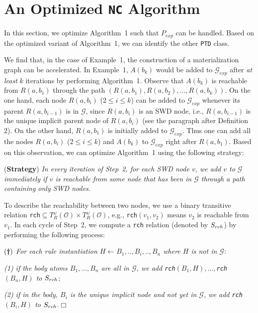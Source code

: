 \documentclass{article}
\begin{document}
\section{An Optimized \texttt{NC} Algorithm}

In this section, we optimize Algorithm~1 such that $P_{exp}$
can be handled. Based on the optimized variant of Algorithm~1, we can identify the other \texttt{PTD} class.

We find that, in the case of Example~1, the construction of a materialization graph can be accelerated.
In Example~1, $A(b_k)$ would be added to $\mathcal{G}_{exp}$ after \emph{at least} $k$ iterations by performing Algorithm~1. Observe that $A(b_k)$ is reachable from $R(a,b_1)$ through the path $(R(a,b_1),R(a,b_2),...,R(a,b_k))$. On the one hand, each node $R(a,b_i)$ ($2\leq i\leq k$) can be added to $\mathcal{G}_{exp}$ whenever its parent $R(a,b_{i-1})$ is in $\mathcal{G}$, since $R(a,b_i)$ is an SWD node, i.e., $R(a,b_{i-1})$ is the unique implicit parent node of $R(a,b_{i})$ (see the paragraph after Definition 2). On the other hand, $R(a,b_1)$ is initially added to $\mathcal{G}_{exp}$. Thus one can add all the nodes $R(a,b_i)$ ($2\leq i\leq k$) and $A(b_k)$ to $\mathcal{G}_{exp}$ right after $R(a,b_1)$.
Based on this observation, we can optimize Algorithm~1 using the following strategy:

(\textbf{Strategy}) \emph{In every iteration of Step~2, for each SWD node $v$, we add $v$ to $\mathcal{G}$ immediately if $v$ is reachable from some node that has been in $\mathcal{G}$ through a path containing only SWD nodes}.

To describe the reachability between two nodes, we use a
binary transitive relation \texttt{rch}$\subseteq T_R^{\omega}(\mathcal{O})\times T_R^{\omega}(\mathcal{O})$, e.g.,
\texttt{rch}$(v_1,v_2)$ means $v_2$ is reachable from $v_1$. In each cycle of Step~2, we compute a \texttt{rch}
relation (denoted by $S_{\tiny rch}$) by performing the following process:

$(\textbf{\dag})$ \emph{For each rule instantiation $H\leftarrow B_1,..,B_i,..,B_n$ where $H$ is not in $\mathcal{G}$}:

\emph{(1) if the body atoms $B_1,...,B_n$ are all in $\mathcal{G}$, we add \texttt{rch}$(B_1,H),...,$\texttt{rch}$(B_n,H)$ to $S_{\tiny rch}$};

\emph{(2) if in the body, $B_i$ is the unique implicit node and not yet in $\mathcal{G}$, we add \texttt{rch}$(B_i,H)$ to $S_{\tiny rch}$}.\hfill$\Box$
\end{document}
